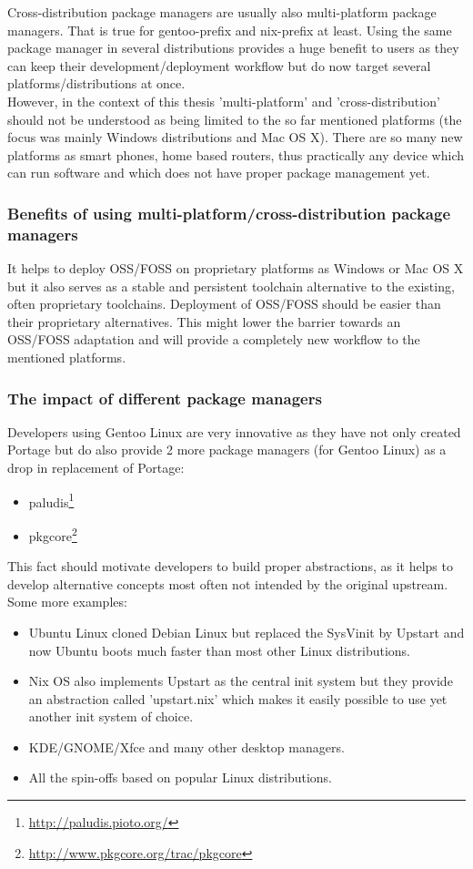 \documentclass[a4paper,10pt]{article}
\begin{document}
Cross-distribution package managers are usually also multi-platform package managers. That is true for gentoo-prefix and nix-prefix at least. Using the same package manager in several distributions provides a huge benefit to users as they can keep their development/deployment workflow but do now target several platforms/distributions at once. \\

However, in the context of this thesis 'multi-platform' and 'cross-distribution' should not be understood as being limited to the so far mentioned platforms (the focus was mainly Windows distributions and Mac OS X). There are so many new platforms as smart phones, home based routers, thus practically any device which can run software and which does not have proper package management yet.

\subsubsection*{Benefits of using multi-platform/cross-distribution package managers}
It helps to deploy OSS/FOSS on proprietary platforms as Windows or Mac OS X but it also serves as a stable and persistent toolchain alternative to the existing, often proprietary toolchains. Deployment of OSS/FOSS should be easier than their proprietary alternatives. This might lower the barrier towards an OSS/FOSS adaptation and will provide a completely new workflow to the mentioned platforms. 

\subsubsection*{The impact of different package managers}
Developers using Gentoo Linux are very innovative as they have not only created Portage but do also provide 2 more package managers (for Gentoo Linux) as a drop in replacement of Portage:
\begin{itemize}
\item paludis\footnote{\url{http://paludis.pioto.org/}}
\item pkgcore\footnote{\url{http://www.pkgcore.org/trac/pkgcore}}
\end{itemize}
This fact should motivate developers to build proper abstractions, as it helps to develop alternative concepts most often not intended by the original upstream. Some more examples:
\begin{itemize}
\item Ubuntu Linux cloned Debian Linux but replaced the SysVinit by Upstart and now Ubuntu boots much faster than most other Linux distributions.
\item Nix OS also implements Upstart as the central init system but they provide an abstraction called 'upstart.nix' which makes it easily possible to use yet another init system of choice.
\item KDE/GNOME/Xfce and many other desktop managers.
\item All the spin-offs based on popular Linux distributions.
\end{itemize}
\end{document}
